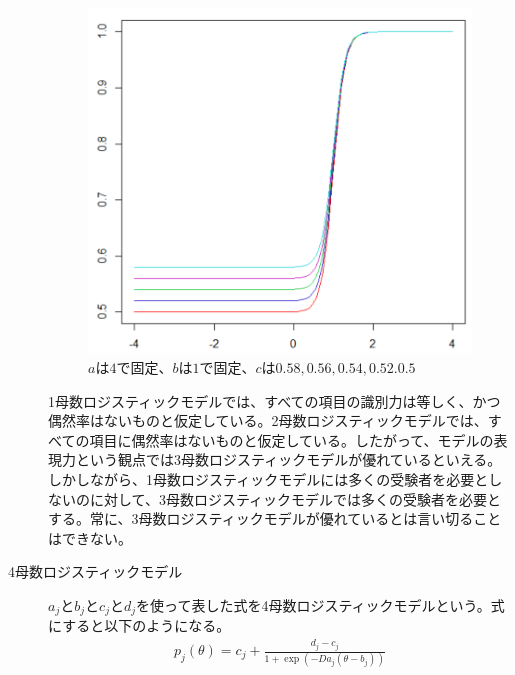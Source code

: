 \documentclass[12pt]{jarticle}
\numberwithin{equation}{subsection}
\begin{document}
\begin{description}
\begin{figure}[H]
    \includegraphics[bb = 500 100 1 1,scale = 0.25]{C.png}
    \vspace{1cm}
    \caption{$a$は$4$で固定、$b$は$1$で固定、$c$は$0.58, 0.56, 0.54, 0.52. 0.5$}
  \end{figure}
  1母数ロジスティックモデルでは、すべての項目の識別力は等しく、かつ偶然率はないものと仮定している。2母数ロジスティックモデルでは、すべての項目に偶然率はないものと仮定している。したがって、モデルの表現力という観点では3母数ロジスティックモデルが優れているといえる。
  しかしながら、1母数ロジスティックモデルには多くの受験者を必要としないのに対して、3母数ロジスティックモデルでは多くの受験者を必要とする。常に、3母数ロジスティックモデルが優れているとは言い切ることはできない。
  \item[4母数ロジスティックモデル]
  $a_j$と$b_j$と$c_j$と$d_j$を使って表した式を4母数ロジスティックモデルという。式にすると以下のようになる。
  \begin{align}
    \label{05}
    \displaystyle p_j(\theta) = c_j + \frac{d_j-c_j}{1+\exp(-Da_j(\theta - b_j))}
  \end{align}
\vspace{3.8cm}
\begin{figure}[H]
  \centering

\end{figure}
\end{description}
\end{document}

